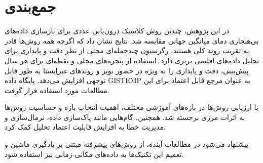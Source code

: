 \section{جمع‌بندی}

در این پژوهش، چندین روش کلاسیک درون‌یابی عددی برای بازسازی داده‌های بی‌هنجاری دمای میانگین جهانی مقایسه شد. نتایج نشان داد که اگرچه همه روش‌ها قادر به تقریب روند کلی هستند، رگرسیون چندجمله‌ای محلی از نظر دقت و پایداری برای تحلیل داده‌های اقلیمی برتری دارد. استفاده از پنجره‌های محلی و نقطه‌ای برای هر سال پیش‌بینی، دقت و پایداری را به ویژه در حضور نویز و روندهای غیرایستا به طور قابل توجهی افزایش می‌دهد. پایگاه داده GISTEMP \cite{gistemp} به عنوان مرجع قابل اعتماد برای این مطالعات مورد استفاده قرار گرفت.

با ارزیابی روش‌ها در بازه‌های آموزشی مختلف، اهمیت انتخاب بازه و حساسیت روش‌ها به اثرات مرزی برجسته شد. همچنین، گام‌هایی مانند پاک‌سازی داده، نرمال‌سازی و مدیریت خطا به افزایش قابلیت اعتماد تحلیل کمک کرد.

پیشنهاد می‌شود در مطالعات آینده، از روش‌های پیشرفته مبتنی بر یادگیری ماشین و تعمیم این تکنیک‌ها به داده‌های مکانی-زمانی نیز استفاده شود.
